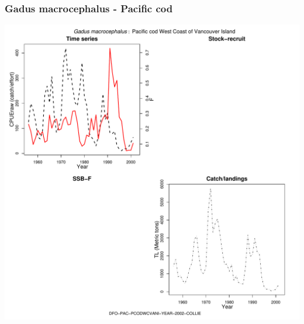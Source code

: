 \subsubsection{Gadus macrocephalus - Pacific cod}
\begin{center}
\includegraphics[width=1.2\textwidth]{../R/figures/DFO-PAC-PCODWCVANI-YEAR-2002-COLLIE.pdf}
\end{center}

